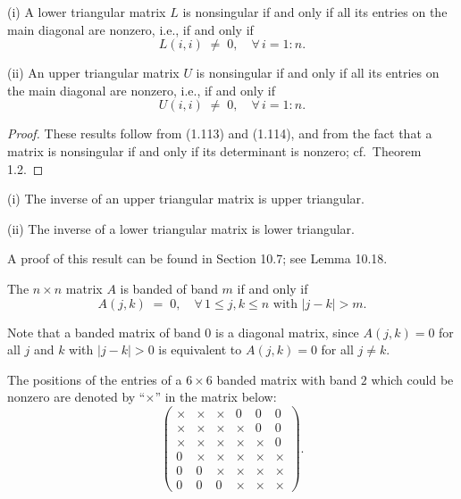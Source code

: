 \begin{lemma}
(i) A lower triangular matrix $L$ is nonsingular if and only if all its
entries on the main diagonal are nonzero, i.e., if and only if
\[
L(i,i) \;\ne\; 0, \quad \forall\, i=1:n.
\]

(ii) An upper triangular matrix $U$ is nonsingular if and only if all its
entries on the main diagonal are nonzero, i.e., if and only if
\[
U(i,i) \;\ne\; 0, \quad \forall\, i=1:n.
\]
\end{lemma}

\begin{proof}
These results follow from (1.113) and (1.114), and from the fact that a
matrix is nonsingular if and only if its determinant is nonzero; cf.\
Theorem 1.2.
\end{proof}

\begin{lemma}
(i) The inverse of an upper triangular matrix is upper triangular.

(ii) The inverse of a lower triangular matrix is lower triangular.
\end{lemma}

A proof of this result can be found in Section 10.7; see Lemma 10.18.

\begin{definition}
The $n\times n$ matrix $A$ is banded of band $m$ if and only if
\[
A(j,k) \;=\; 0, \quad \forall\, 1\le j,k\le n \text{ with } |j-k|>m.
\]
\end{definition}

Note that a banded matrix of band $0$ is a diagonal matrix, since
$A(j,k)=0$ for all $j$ and $k$ with $|j-k|>0$ is equivalent to $A(j,k)=0$
for all $j\ne k$.

\begin{examplex}
The positions of the entries of a $6\times 6$ banded matrix with band $2$
which could be nonzero are denoted by ``$\times$'' in the matrix below:
\[
\begin{pmatrix}
\times & \times & \times & 0 & 0 & 0 \\
\times & \times & \times & \times & 0 & 0 \\
\times & \times & \times & \times & \times & 0 \\
0 & \times & \times & \times & \times & \times \\
0 & 0 & \times & \times & \times & \times \\
0 & 0 & 0 & \times & \times & \times
\end{pmatrix}.
\]
\end{examplex}
